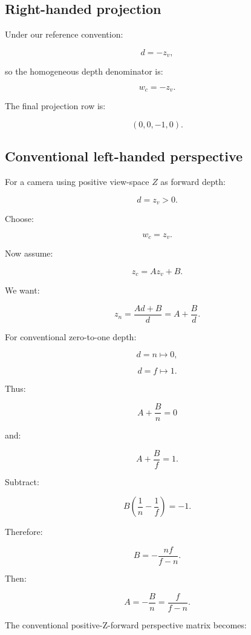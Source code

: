 \subsection{Right-handed projection}\label{02-foundations-ii-ch033-right-handed-projection}

\hypertarget{02-foundations-ii-ch033-right-handed-projection}{}

Under our reference convention:

\[
 d=-z_v,
\]

so the homogeneous depth denominator is:

\[
 \boxed{w_c=-z_v}.
\]

The final projection row is:

\[
 \boxed{ (0,0,-1,0) }.
\]

\subsection{Conventional left-handed perspective}\label{02-foundations-ii-ch033-conventional-left-handed-perspective}

\hypertarget{02-foundations-ii-ch033-conventional-left-handed-perspective}{}

For a camera using positive view-space \(Z\) as forward depth:

\[
 d=z_v>0.
\]

Choose:

\[
 \boxed{w_c=z_v}.
\]

Now assume:

\[
 z_c=Az_v+B.
\]

We want:

\[
 z_n=\frac{Ad+B}{d} =A+\frac Bd.
\]

For conventional zero-to-one depth:

\[
 d=n\mapsto0,
\]

\[
 d=f\mapsto1.
\]

Thus:

\[
 A+\frac Bn=0
\]

and:

\[
 A+\frac Bf=1.
\]

Subtract:

\[
 B\left(\frac1n-\frac1f\right)=-1.
\]

Therefore:

\[
 \boxed{ B=-\frac{nf}{f-n} }.
\]

Then:

\[
 A=-\frac Bn=\frac f{f-n}.
\]

The conventional positive-Z-forward perspective matrix becomes:

